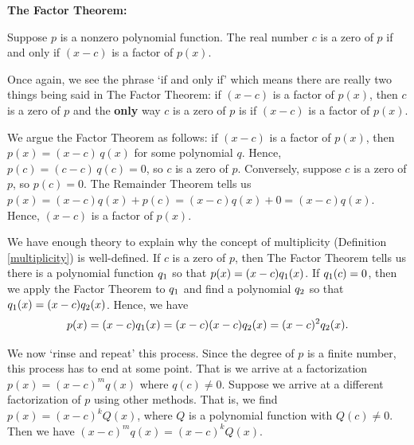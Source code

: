 \medskip

\colorbox{ResultColor}{\bbm

\begin{thm} \label{factorthm}\textbf{The Factor Theorem:}  

Suppose $p$ is a nonzero polynomial function.  The real number $c$ is a zero of $p$ if and only if $(x-c)$ is a factor of $p(x)$.  

\end{thm}
\ebm}

\medskip

Once again, we see the phrase `if and only if' which means there are really two things being said in  The Factor Theorem:  if $(x-c)$ is a factor of $p(x)$, then $c$ is a zero of $p$ and the \textbf{only} way $c$ is a zero  of $p$ is if $(x-c)$ is a factor of $p(x)$.  

\medskip

We argue the Factor Theorem as follows:   if $(x-c)$ is a factor of $p(x)$, then $p(x) = (x-c) \, q(x)$ for some polynomial $q$.  Hence, $p(c) = (c-c) \, q(c) = 0$, so $c$ is a zero of $p$.  Conversely, suppose $c$ is a zero of $p$, so $p(c) = 0$.   The Remainder Theorem tells us $p(x) = (x-c)q(x) + p(c) = (x-c)q(x) + 0 = (x-c)q(x)$.   Hence, $(x-c)$ is a factor of $p(x)$. 

\medskip

We have enough theory to explain why the concept of multiplicity (Definition \ref{multiplicity}) is well-defined. If $c$ is a zero of $p$, then The Factor Theorem tells us there is a polynomial function $q_{\text{\scriptsize $1$}}$ so that $p(x) = (x-c)q_{\text{\scriptsize $1$}}(x)$.  If $q_{\text{\scriptsize $1$}}(c) = 0$, then we apply the Factor Theorem to $q_{\text{\scriptsize $1$}}$ and find a  polynomial $q_{\text{\scriptsize $2$}}$ so that $q_{\text{\scriptsize $1$}}(x)  = (x-c) q_{\text{\scriptsize $2$}}(x)$.    Hence, we have  \[p(x) = (x-c) q_{\text{\scriptsize $1$}}(x) = (x-c) (x-c) q_{\text{\scriptsize $2$}}(x) = (x-c)^2 q_{\text{\scriptsize $2$}}(x).\]

\medskip

We now `rinse and repeat' this process.  Since the degree of $p$ is a finite number, this process has to end at some point.  That is we arrive at a factorization  $p(x) = (x-c)^m q(x)$ where $q(c) \neq 0$.  Suppose we arrive at a different factorization of $p$ using other methods.  That is, we find $p(x) = (x-c)^k Q(x)$, where $Q$ is a polynomial function with $Q(c) \neq 0$.   Then we have $(x-c)^m q(x) = (x-c)^k Q(x)$.    


